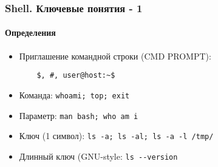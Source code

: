 \begin{frame}[fragile]
  \frametitle{Shell. Ключевые понятия - 1}
  \framesubtitle{Определения}

  \begin{itemize}
    \item \alert{Приглашение командной строки (CMD PROMPT)}: \pause 
      \begin{verbatim}
	$, #, user@host:~$
      \end{verbatim} \pause
    \item \alert{Команда}: \newline \verb+whoami; top; exit+ \pause
    \item \alert{Параметр}: \newline \verb+man bash; who am i+ \pause
    \item \alert{Ключ (1 символ)}: \newline \verb+ls -a; ls -al; ls -a -l /tmp/+ \pause
    \item \alert{Длинный ключ (GNU-style}: \newline \verb+ls --version+
  \end{itemize}
\end{frame}
